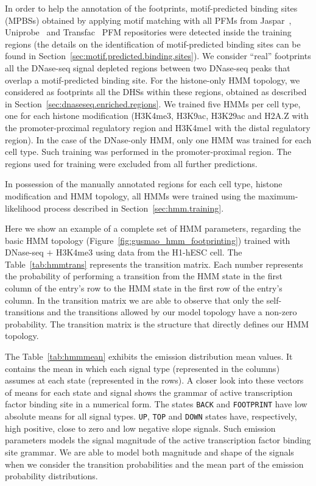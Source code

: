 In order to help the annotation of the footprints, motif-predicted binding sites (MPBSs) obtained by applying motif matching with all PFMs from Jaspar~\cite{mathelier2014}, Uniprobe~\cite{robasky2011} and Transfac~\cite{matys2006} PFM repositories were detected inside the training regions (the details on the identification of motif-predicted binding sites can be found in Section~\ref{sec:motif.predicted.binding.sites}). We consider ``real'' footprints all the DNase-seq signal depleted regions between two DNase-seq peaks that overlap a motif-predicted binding site. For the histone-only HMM topology, we considered as footprints all the DHSs within these regions, obtained as described in Section~\ref{sec:dnaseseq.enriched.regions}. We trained five HMMs per cell type, one for each histone modification (H3K4me3, H3K9ac, H3K29ac and H2A.Z with the promoter-proximal regulatory region and H3K4me1 with the distal regulatory region). In the case of the DNase-only HMM, only one HMM was trained for each cell type. Such training was performed in the promoter-proximal region. The regions used for training were excluded from all further predictions.

In possession of the manually annotated regions for each cell type, histone modification and HMM topology, all HMMs were trained using the maximum-likelihood process described in Section~\ref{sec:hmm.training}.

Here we show an example of a complete set of HMM parameters, regarding the basic HMM topology (Figure~\ref{fig:gusmao_hmm_footprinting}) trained with DNase-seq $+$ H3K4me3 using data from the H1-hESC cell. The Table~\ref{tab:hmmtrans} represents the transition matrix. Each number represents the probability of performing a transition from the HMM state in the first column of the entry's row to the HMM state in the first row of the entry's column. In the transition matrix we are able to observe that only the self-transitions and the transitions allowed by our model topology have a non-zero probability. The transition matrix is the structure that directly defines our HMM topology.

The Table~\ref{tab:hmmmean} exhibits the emission distribution mean values. It contains the mean in which each signal type (represented in the columns) assumes at each state (represented in the rows). A closer look into these vectors of means for each state and signal shows the grammar of active transcription factor binding site in a numerical form. The states {\tt BACK} and {\tt FOOTPRINT} have low absolute means for all signal types. {\tt UP}, {\tt TOP} and {\tt DOWN} states have, respectively, high positive, close to zero and low negative slope signals. Such emission parameters models the signal magnitude of the active transcription factor binding site grammar. We are able to model both magnitude and shape of the signals when we consider the transition probabilities and the mean part of the emission probability distributions.

